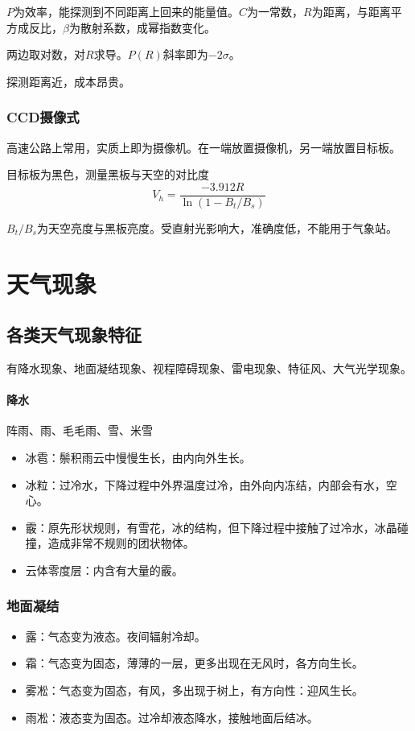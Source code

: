 \documentclass[UTF8,11pt]{ctexbook}
\begin{document}
\(P\)为效率，能探测到不同距离上回来的能量值。\(C\)为一常数，\(R\)为距离，与距离平方成反比，\(\beta\)为散射系数，成幂指数变化。

两边取对数，对\(R\)求导。\(P(R)\)斜率即为\(-2\sigma\)。

探测距离近，成本昂贵。

\subsection{CCD摄像式}

高速公路上常用，实质上即为摄像机。在一端放置摄像机，另一端放置目标板。

目标板为黑色，测量黑板与天空的对比度
\[
V_h=\frac{-3.912R}{\ln(1-B_t/B_s)}
\]

\(B_t/B_s\)为天空亮度与黑板亮度。受直射光影响大，准确度低，不能用于气象站。

\chapter{天气现象}

\section{各类天气现象特征}

有降水现象、地面凝结现象、视程障碍现象、雷电现象、特征风、大气光学现象。

\subsubsection{降水}

阵雨、雨、毛毛雨、雪、米雪
\begin{itemize}
    \item 冰雹：鬃积雨云中慢慢生长，由内向外生长。
    \item 冰粒：过冷水，下降过程中外界温度过冷，由外向内冻结，内部会有水，空心。
    \item 霰：原先形状规则，有雪花，冰的结构，但下降过程中接触了过冷水，冰晶碰撞，造成非常不规则的团状物体。
    \item 云体零度层：内含有大量的霰。
\end{itemize}

\subsection{地面凝结}
\begin{itemize}
    \item 露：气态变为液态。夜间辐射冷却。
    \item 霜：气态变为固态，薄薄的一层，更多出现在无风时，各方向生长。
    \item 雾凇：气态变为固态，有风，多出现于树上，有方向性：迎风生长。
    \item 雨凇：液态变为固态。过冷却液态降水，接触地面后结冰。
\end{itemize}
\end{document}
